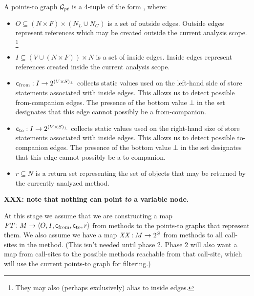 \documentclass[11pt,notitlepage]{article}
\newcommand{\bigvar}[1]{\ensuremath{\text{\it #1}}}
\newcommand{\func}[1]{\ensuremath{\text{\sffamily #1}}}
\newcommand{\ptgraphA}
           {\tuple{O,I,\func{c}_\text{from},\func{c}_\text{to},r}}
\begin{document}
A points-to graph $\mathcal{G}_\bigvar{pt}$ is a 4-tuple of the form \ptgraphA,
where:
\begin{itemize}
\item $O \subseteq (N\times F)\times(N_L \cup N_G)$ is a set of
outside edges.  Outside edges represent references which may be
created outside the current analysis scope.%
\footnote{They may also (perhaps exclusively) alias to inside edges.}
\item $I \subseteq (V\cup(N\times F))\times N$ is a set of inside
edges.  Inside edges represent references created inside the current
analysis scope.
\item $\func{c}_\text{from}:I\to 2^{(V\times S)_\bot}$ collects static values
used on the left-hand side of store statements associated with
inside edges.  This allows us to detect possible from-companion edges.
The presence of the bottom value $\bot$ in the set designates that
this edge cannot possibly be a from-companion.
\item $\func{c}_\text{to}:I\to 2^{(V\times S)_\bot}$ collects static values
used on the right-hand size of store statements associated with
inside edges.  This allows us to detect possible to-companion edges.
The presence of the bottom value $\bot$ in the set designates that
this edge cannot possibly be a to-companion.
\item $r \subseteq N$ is a return set representing the set of objects
that may be returned by the currently analyzed method.
\end{itemize}
\textbf{XXX: note that nothing can point \emph{to} a variable node.}

At this stage we assume that we are constructing a map
$\bigvar{PT}:M\to\ptgraphA$ from methods to the points-to graphs that
represent them.  We also assume we have a map $\bigvar{XX}:M\to 2^S$
from methods to all call-sites in the method.  (This isn't needed
until phase 2.  Phase 2 will also want a map from call-sites to
the possible methods reachable from that call-site, which will
use the current points-to graph for filtering.)
\end{document}
